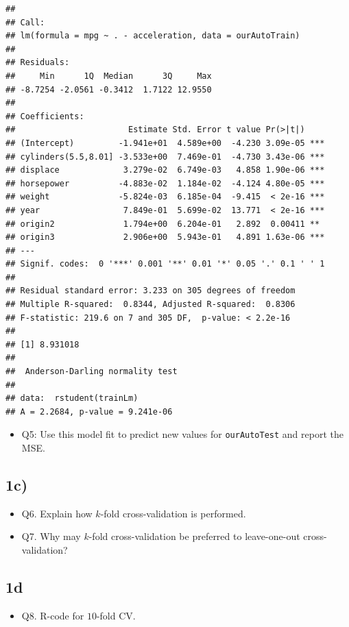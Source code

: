 \documentclass[]{article}
\providecommand{\tightlist}{%
  \setlength{\itemsep}{0pt}\setlength{\parskip}{0pt}}
\begin{document}
\begin{verbatim}
## 
## Call:
## lm(formula = mpg ~ . - acceleration, data = ourAutoTrain)
## 
## Residuals:
##     Min      1Q  Median      3Q     Max 
## -8.7254 -2.0561 -0.3412  1.7122 12.9550 
## 
## Coefficients:
##                       Estimate Std. Error t value Pr(>|t|)    
## (Intercept)         -1.941e+01  4.589e+00  -4.230 3.09e-05 ***
## cylinders(5.5,8.01] -3.533e+00  7.469e-01  -4.730 3.43e-06 ***
## displace             3.279e-02  6.749e-03   4.858 1.90e-06 ***
## horsepower          -4.883e-02  1.184e-02  -4.124 4.80e-05 ***
## weight              -5.824e-03  6.185e-04  -9.415  < 2e-16 ***
## year                 7.849e-01  5.699e-02  13.771  < 2e-16 ***
## origin2              1.794e+00  6.204e-01   2.892  0.00411 ** 
## origin3              2.906e+00  5.943e-01   4.891 1.63e-06 ***
## ---
## Signif. codes:  0 '***' 0.001 '**' 0.01 '*' 0.05 '.' 0.1 ' ' 1
## 
## Residual standard error: 3.233 on 305 degrees of freedom
## Multiple R-squared:  0.8344, Adjusted R-squared:  0.8306 
## F-statistic: 219.6 on 7 and 305 DF,  p-value: < 2.2e-16
## 
## [1] 8.931018
## 
##  Anderson-Darling normality test
## 
## data:  rstudent(trainLm)
## A = 2.2684, p-value = 9.241e-06
\end{verbatim}

\begin{itemize}
\tightlist
\item
  Q5: Use this model fit to predict new values for \texttt{ourAutoTest}
  and report the MSE.
\end{itemize}

\subsection{1c)}\label{c}

\begin{itemize}
\tightlist
\item
  Q6. Explain how \(k\)-fold cross-validation is performed.
\item
  Q7. Why may \(k\)-fold cross-validation be preferred to leave-one-out
  cross-validation?
\end{itemize}

\subsection{1d}\label{d}

\begin{itemize}
\tightlist
\item
  Q8. R-code for \(10\)-fold CV.
\end{itemize}
\end{document}

